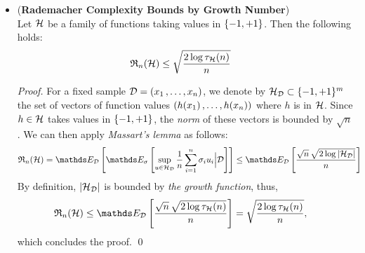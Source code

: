 \documentclass[11pt]{article}
\begin{document}
\begin{itemize}
\item \begin{corollary} \label{cor: Rademacher_growth} (\textbf{Rademacher Complexity Bounds by Growth Number}) \citep{mohri2018foundations}\\
Let ${\mathcal H}$ be a family of functions taking values in $\left\{-1, +1\right\}$. Then the following holds:
\begin{align}
{\mathfrak R}_{n}({\mathcal H}) &\le \sqrt{\frac{2 \log \tau_{{\mathcal H}}(n)}{n}} \label{eqn: growth_number_Rademacher_comp}
\end{align}
\end{corollary}
\begin{proof}
For a fixed sample ${\mathcal D} = (x_1 \,{,}\ldots{,}\, x_n)$, we denote by ${\mathcal H}_{{\mathcal D}} \subset \{-1, +1\}^{m}$ the set of vectors of function values $(h(x_1) \,{,}\ldots{,}\, h(x_n))$ where $h$ is in ${\mathcal H}$. Since $h\in {\mathcal H}$ takes values in $\left\{-1, +1\right\}$, the \emph{norm} of these vectors is bounded by $\sqrt{n}$. We can then apply
\emph{Massart's lemma} as follows:
\begin{align*}
\frR_{n}(\cH) &= \E{\cD}{\E{\sigma}{\sup_{u \in \cH_{\cD}}\frac{1}{n}\sum_{i=1}^{n}\sigma_i u_i \Big| \cD}} \le  \E{\cD}{\frac{\sqrt{n}\,\sqrt{2 \log\abs{\cH_{\cD}}}}{n}}
\end{align*}
By definition, $\left\lvert {\mathcal H}_{{\mathcal D}} \right\rvert$ is bounded by \emph{the growth function}, thus,
\begin{align*}
\frR_{n}(\cH)  &\le  \E{\cD}{\frac{\sqrt{n}\,\sqrt{2 \log \tau_{\cH}(n)}}{n}} = \sqrt{\frac{2 \log \tau_{\cH}(n)}{n}},
\end{align*}
which concludes the proof. \qed
\end{proof}
\end{itemize}
\end{document}
